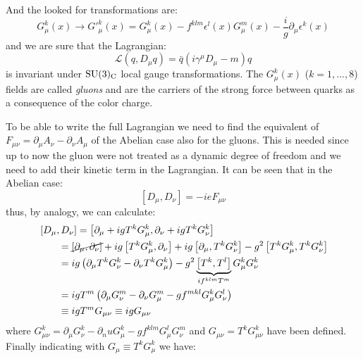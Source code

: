 And the looked for transformations are:
\begin{equation}
  \label{eq:138}
  G_\mu^k(x) \rightarrow {G'}_\mu^k(x) = G_\mu^k(x) -
  f^{klm}\epsilon^l(x)G_\mu^m(x) - \frac{i}{g}\partial_\mu \epsilon^k(x)
\end{equation}
and we are sure that the Lagrangian:
\begin{equation}
\mathcal{L}(q, D_\mu q)\label{eq:139} = \bar{q}\left( i \gamma^\mu D_\mu - m \right) q
\end{equation}
is invariant under $\mathrm{SU}(3)_\mathrm{C}$ local gauge transformations. The $G_\mu^k(x)$ ($k
= 1, \dots, 8$) fields are called \emph{gluons} and are the carriers of the
strong force between quarks as a consequence of the color charge.

To be able to write the full Lagrangian we need to find the equivalent of
$F_{\mu\nu} = \partial_\mu A_\nu - \partial_\nu A_\mu$ of the Abelian case also
for the gluons. This is needed since up to now the gluon were not treated as a
dynamic degree of freedom and we need to add their kinetic term in the
Lagrangian. It can be seen that in the Abelian case:
\begin{equation}
  \label{eq:140}
  \left[D_\mu, D_\nu \right] = -ieF_{\mu\nu}
\end{equation}
thus, by analogy, we can calculate:
\begin{equation}
  \label{eq:141}
  \begin{aligned}
    \MoveEqLeft \left[D_\mu, D_\nu \right] = \left[\partial_\mu + ig T^k G_\mu^k, \partial_\nu +
      ig T^k G_\nu^k \right] \\
    & = \cancel{\left[\partial_\mu, \partial_\nu \right]} + ig
    \left[T^kG_\mu^k, \partial_\nu \right] + ig \left[\partial_\mu, T^kG_\nu^k
    \right] - g^2 \left[T^kG_\mu^k, T^kG_\nu^k
    \right] \\
    & = ig \left( \partial_\mu T^kG_\nu^k - \partial_\nu T^k G_\mu^k \right) -
    g^2 \underbrace{\left[T^k, T^l \right]}_{if^{klm}T^m} G_\mu^k G_\nu^k \\
    & = ig T^m \left( \partial_\mu G_\nu^m - \partial_\nu G_\mu^m - g f^{mkl}
      G_\mu^k G_\nu^l\right) \\
    & \equiv ig T^m G_{\mu\nu} \equiv ig G_{\mu\nu}
  \end{aligned}
\end{equation}
where $G_{\mu\nu}^k = \partial_\mu G_\nu^k -
\partial_nu G_\mu^k - g f^{klm} G_\mu^l G_\nu^m$ and
$G_{\mu\nu} = T^k G_{\mu\nu}^k$ have been defined. Finally indicating with
$G_\mu \equiv T^k G_\mu^k$ we have:
